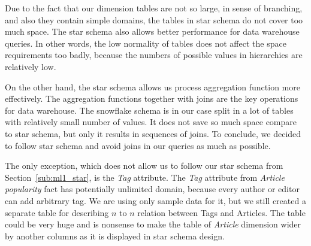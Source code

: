 
Due to the fact that our dimension tables are not so large, in sense of branching, and also they contain simple domains, the tables in star schema do not cover too much space.
 The star schema also allows better performance for data warehouse queries. In other words, the low normality of tables does not affect the space requirements too badly, because the numbers of possible values in hierarchies are relatively low.

On the other hand, the star schema allows us process aggregation function more effectively.
The aggregation functions together with joins are the key operations for data warehouse. 
The snowflake schema is in our case split in a lot of tables with relatively small number of values.
It does not save so much space compare to star schema, but only it results in sequences of joins.
To conclude, we decided to follow star schema and avoid joins in our queries as much as possible.

The only exception, which does not allow us to follow our star schema from Section~\ref{sub:ml1_star}, is the {\it Tag} attribute. 
The {\it Tag} attribute from {\it Article popularity} fact has potentially unlimited domain, because every author or editor can add arbitrary tag.  
We are using only sample data for it, but we still created a separate table for describing $n$ to $n$ relation between Tags and Articles. 
The table could be very huge and is nonsense  to make the table of {\it Article} dimension wider by another columns as it is displayed in star schema design. 
